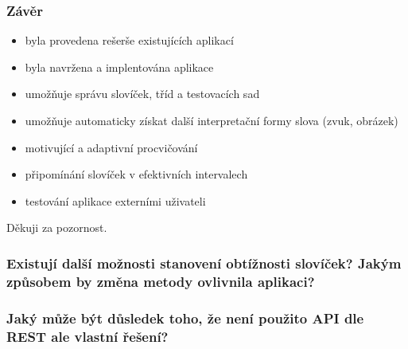 \begin{frame}[t]
    \frametitle{Závěr}
    \begin{itemize}
        \item byla provedena rešerše existujících aplikací 
        \item byla navržena a implentována aplikace
        \item umožňuje správu slovíček, tříd a testovacích sad
        \item umožňuje automaticky získat další interpretační formy slova (zvuk, obrázek)
        \item motivující a adaptivní procvičování
        \item připomínání slovíček v efektivních intervalech
        \item testování aplikace externími uživateli
    \end{itemize}
\end{frame}


\begin{frame}
\begin{center}
\label{lastslide}
\huge Děkuji za pozornost.
\end{center}
\end{frame}

\begin{frame}[noframenumbering]
\begin{center}
    \frametitle{Existují další možnosti stanovení obtížnosti slovíček? Jakým způsobem by změna metody ovlivnila aplikaci?}


\end{center}
\end{frame}

\begin{frame}[noframenumbering]
\begin{center}
    \frametitle{Jaký může být důsledek toho, že není použito API dle REST ale vlastní řešení?}
\end{center}
\end{frame}

